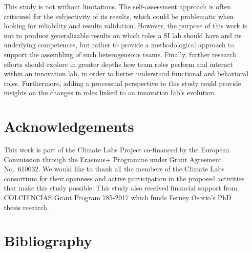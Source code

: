 \documentclass[AMA,STIX1COL,APA,STIX2COL]{WileyNJD-v2}
\begin{document}
This study is not without limitations. The self-assessment approach is
often criticized for the subjectivity of its results, which could be
problematic when looking for reliability and results validation.
However, the purpose of this work is not to produce generalizable
results on which roles a SI lab should have and its underlying
competences, but rather to provide a methodological approach to support
the assembling of such heterogeneous teams. Finally, further research
efforts should explore in greater depths how team roles perform and
interact within an innovation lab, in order to better understand
functional and behavioral roles. Furthermore, adding a processual
perspective to this study could provide insights on the changes in roles
linked to an innovation lab's evolution.

\hypertarget{acknowledgements}{%
\section{Acknowledgements}\label{acknowledgements}}

This work is part of the Climate Labs Project co-financed by the
European Commission through the Erasmus+ Programme under Grant Agreement
No.~610032. We would like to thank all the members of the Climate Labs
consortium for their openness and active participation in the proposed
activities that make this study possible. This study also received
financial support from COLCIENCIAS Grant Program 785-2017 which funds
Ferney Osorio's PhD thesis research.

\newpage

\hypertarget{bibliography}{%
\section{Bibliography}\label{bibliography}}
\end{document}
